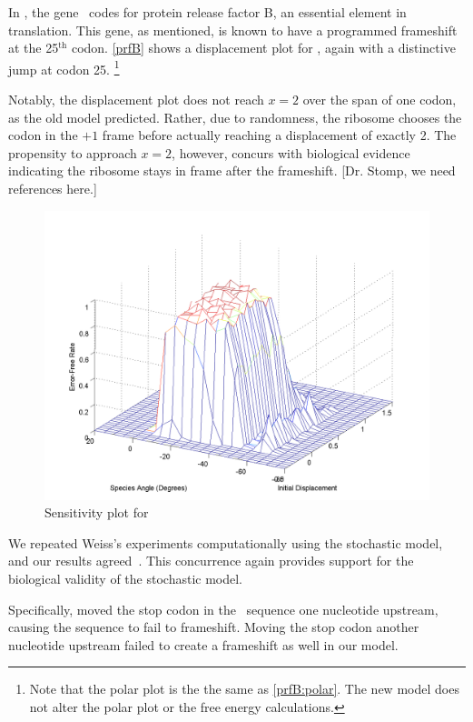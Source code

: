 \documentclass[12pt, draft]{article}
\numberwithin{equation}{section}
\begin{document}
In \ecoli, the gene \prfB\ codes for protein release factor B, an
essential element in translation.  This gene, as mentioned, is known
to have a programmed frameshift at the 25$^{\textrm{th}}$ codon.
\autoref{prfB} shows a displacement plot for
\prfB, again with a distinctive jump at codon 25.
\footnote{Note that the polar plot is the the same as \autoref{prfB:polar}. 
The new model does not alter the polar plot or the free energy calculations.}

Notably, the displacement plot does not reach $x=2$ over the span of one codon, as the old model predicted.
Rather, due to randomness, the ribosome chooses the codon in the $+1$ frame before actually reaching a displacement of exactly 2.
The propensity to approach $x=2$, however, concurs with biological
evidence indicating the ribosome stays in frame after the frameshift.
[Dr. Stomp, we need references here.]

\begin{figure}
  \centering
  \caption{Sensitivity plot for \prfB}
  \label{prfB:sens}
  \includegraphics[scale=0.4]{prfB/sensitivity}
\end{figure}

We repeated Weiss's experiments computationally
using the stochastic model, and our results agreed~\cite{weiss87,weiss88}.
This concurrence again provides support for the biological validity of
the stochastic model.

Specifically, \citeauthor{weiss87} moved the stop codon in the
\prfB\ sequence one nucleotide upstream, causing the sequence to fail to
frameshift. Moving the stop codon another nucleotide upstream failed
to create a frameshift as well in our model.
\end{document}

